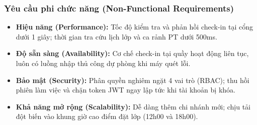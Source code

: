 \documentclass[a4paper,12pt]{article}
\begin{document}
\subsubsection{Yêu cầu phi chức năng (Non-Functional Requirements)}
\begin{itemize}
    \item \textbf{Hiệu năng (Performance):} Tốc độ kiểm tra và phản hồi check-in tại cổng dưới 1 giây; thời gian tra cứu lịch lớp và ca rảnh PT dưới 500ms.
    \item \textbf{Độ sẵn sàng (Availability):} Cơ chế check-in tại quầy hoạt động liên tục, luôn có luồng nhập thủ công dự phòng khi máy quét lỗi.
    \item \textbf{Bảo mật (Security):} Phân quyền nghiêm ngặt 4 vai trò (RBAC); thu hồi phiên làm việc và chặn token JWT ngay lập tức khi tài khoản bị khóa.
    \item \textbf{Khả năng mở rộng (Scalability):} Dễ dàng thêm chi nhánh mới; chịu tải đột biến vào khung giờ cao điểm đặt lớp (12h00 và 18h00).
\end{itemize}
\end{document}
